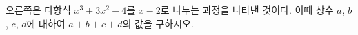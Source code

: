 \noindent\begin{minipage}[t]{0.58\linewidth}\vspace{0pt}\raggedright 오른쪽은 다항식 $x^3+3x^2-4$를 $x-2$로 나누는 과정을 나타낸 것이다. 이때 상수 $a$, $b$, $c$, $d$에 대하여 $a+b+c+d$의 값을 구하시오.\end{minipage}\hfill\begin{minipage}[t]{0.4\linewidth}\vspace{0pt}\centering \resizebox{\ifdim\width>\linewidth\linewidth\else\width\fi}{!}{}\end{minipage}\par

